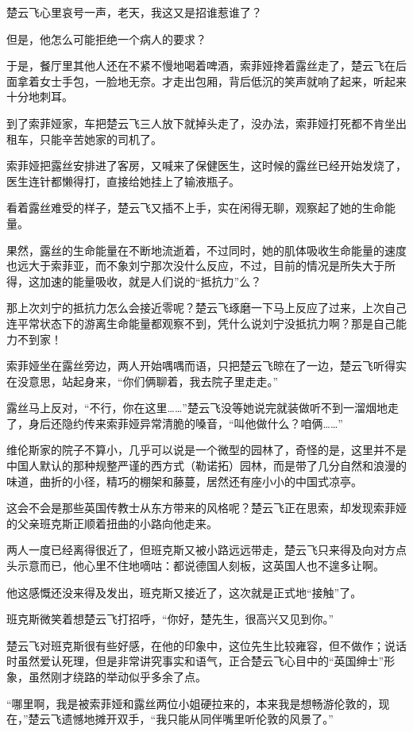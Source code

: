 楚云飞心里哀号一声，老天，我这又是招谁惹谁了？

但是，他怎么可能拒绝一个病人的要求？

于是，餐厅里其他人还在不紧不慢地喝着啤酒，索菲娅搀着露丝走了，楚云飞在后面拿着女士手包，一脸地无奈。才走出包厢，背后低沉的笑声就响了起来，听起来十分地刺耳。

到了索菲娅家，车把楚云飞三人放下就掉头走了，没办法，索菲娅打死都不肯坐出租车，只能辛苦她家的司机了。

索菲娅把露丝安排进了客房，又喊来了保健医生，这时候的露丝已经开始发烧了，医生连针都懒得打，直接给她挂上了输液瓶子。

看着露丝难受的样子，楚云飞又插不上手，实在闲得无聊，观察起了她的生命能量。

果然，露丝的生命能量在不断地流逝着，不过同时，她的肌体吸收生命能量的速度也远大于索菲亚，而不象刘宁那次没什么反应，不过，目前的情况是所失大于所得，这加速的能量吸收，就是人们说的“抵抗力”么？

那上次刘宁的抵抗力怎么会接近零呢？楚云飞琢磨一下马上反应了过来，上次自己连平常状态下的游离生命能量都观察不到，凭什么说刘宁没抵抗力啊？那是自己能力不到家！

索菲娅坐在露丝旁边，两人开始喁喁而语，只把楚云飞晾在了一边，楚云飞听得实在没意思，站起身来，“你们俩聊着，我去院子里走走。”

露丝马上反对，“不行，你在这里……”楚云飞没等她说完就装做听不到一溜烟地走了，身后还隐约传来索菲娅异常清脆的嗓音，“叫他做什么？咱俩……”

维伦斯家的院子不算小，几乎可以说是一个微型的园林了，奇怪的是，这里并不是中国人默认的那种规整严谨的西方式（勒诺拓）园林，而是带了几分自然和浪漫的味道，曲折的小径，精巧的棚架和藤蔓，居然还有座小小的中国式凉亭。

这会不会是那些英国传教士从东方带来的风格呢？楚云飞正在思索，却发现索菲娅的父亲班克斯正顺着扭曲的小路向他走来。

两人一度已经离得很近了，但班克斯又被小路远远带走，楚云飞只来得及向对方点头示意而已，他心里不住地嘀咕：都说德国人刻板，这英国人也不遑多让啊。

他这感慨还没来得及发出，班克斯又接近了，这次就是正式地“接触”了。

班克斯微笑着想楚云飞打招呼，“你好，楚先生，很高兴又见到你。”

楚云飞对班克斯很有些好感，在他的印象中，这位先生比较雍容，但不做作；说话时虽然爱认死理，但是非常讲究事实和语气，正合楚云飞心目中的“英国绅士”形象，虽然刚才绕路的举动似乎多余了点。

“哪里啊，我是被索菲娅和露丝两位小姐硬拉来的，本来我是想畅游伦敦的，现在，”楚云飞遗憾地摊开双手，“我只能从同伴嘴里听伦敦的风景了。”

